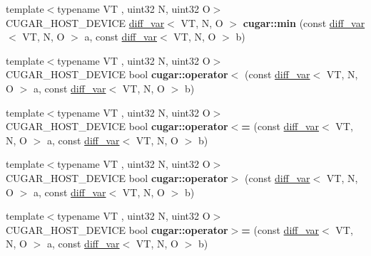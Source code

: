 \begin{DoxyCompactItemize}
{\footnotesize template$<$typename VT , uint32 N, uint32 O$>$ }\\C\+U\+G\+A\+R\+\_\+\+H\+O\+S\+T\+\_\+\+D\+E\+V\+I\+CE \hyperlink{structcugar_1_1diff__var}{diff\+\_\+var}$<$ VT, N, O $>$ {\bfseries cugar\+::min} (const \hyperlink{structcugar_1_1diff__var}{diff\+\_\+var}$<$ VT, N, O $>$ a, const \hyperlink{structcugar_1_1diff__var}{diff\+\_\+var}$<$ VT, N, O $>$ b)
\item 
\mbox{\label{group___auto_diff_module_ga0542b60dcce14bcafd396672997d3ebb}} 
{\footnotesize template$<$typename VT , uint32 N, uint32 O$>$ }\\C\+U\+G\+A\+R\+\_\+\+H\+O\+S\+T\+\_\+\+D\+E\+V\+I\+CE bool {\bfseries cugar\+::operator$<$} (const \hyperlink{structcugar_1_1diff__var}{diff\+\_\+var}$<$ VT, N, O $>$ a, const \hyperlink{structcugar_1_1diff__var}{diff\+\_\+var}$<$ VT, N, O $>$ b)
\item 
\mbox{\label{group___auto_diff_module_ga992dba1545c79fd8271680a709fb3d7b}} 
{\footnotesize template$<$typename VT , uint32 N, uint32 O$>$ }\\C\+U\+G\+A\+R\+\_\+\+H\+O\+S\+T\+\_\+\+D\+E\+V\+I\+CE bool {\bfseries cugar\+::operator$<$=} (const \hyperlink{structcugar_1_1diff__var}{diff\+\_\+var}$<$ VT, N, O $>$ a, const \hyperlink{structcugar_1_1diff__var}{diff\+\_\+var}$<$ VT, N, O $>$ b)
\item 
\mbox{\label{group___auto_diff_module_ga998a1c4df44a91f91049b8e3ec9a5501}} 
{\footnotesize template$<$typename VT , uint32 N, uint32 O$>$ }\\C\+U\+G\+A\+R\+\_\+\+H\+O\+S\+T\+\_\+\+D\+E\+V\+I\+CE bool {\bfseries cugar\+::operator$>$} (const \hyperlink{structcugar_1_1diff__var}{diff\+\_\+var}$<$ VT, N, O $>$ a, const \hyperlink{structcugar_1_1diff__var}{diff\+\_\+var}$<$ VT, N, O $>$ b)
\item 
\mbox{\label{group___auto_diff_module_ga706f994549bfd58fdbc1ff3a4c91442a}} 
{\footnotesize template$<$typename VT , uint32 N, uint32 O$>$ }\\C\+U\+G\+A\+R\+\_\+\+H\+O\+S\+T\+\_\+\+D\+E\+V\+I\+CE bool {\bfseries cugar\+::operator$>$=} (const \hyperlink{structcugar_1_1diff__var}{diff\+\_\+var}$<$ VT, N, O $>$ a, const \hyperlink{structcugar_1_1diff__var}{diff\+\_\+var}$<$ VT, N, O $>$ b)
\end{DoxyCompactItemize}


